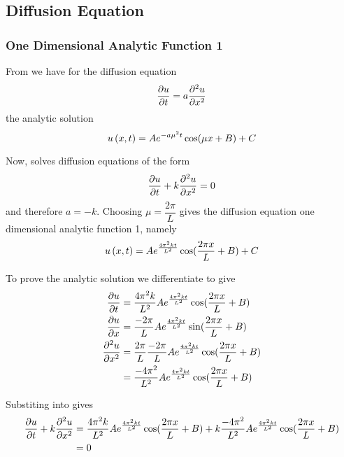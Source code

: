 \subsection{Diffusion Equation} 

\subsubsection{One Dimensional Analytic Function 1}

From  we have for the \oned diffusion equation
\begin{equation}
   \dfrac{\partial u}{\partial t} =a \dfrac{\partial^{2} u}{\partial {x}^{2}} 
\end{equation}
the analytic solution
\begin{equation}
   u\left( x,t \right) =Ae^{-a\mu^{2}t}\cos(\mu x + B) + C
\end{equation}

Now, \OpenCMISS solves diffusion equations of the form
\begin{equation}
  \delby{u}{t}+k\deltwosqby{u}{x}=0
  \label{eqn:OpenCMISSDiffusionEquationOneDim}
\end{equation}
and therefore $a=-k$. Choosing $\mu=\dfrac{2\pi}{L}$ gives the
\OpenCMISS diffusion equation one dimensional analytic function 1, namely
\begin{equation}
  \fnof{u}{x,t}=Ae^{\frac{4\pi^{2}kt}{L^{2}}}\cos(\frac{2\pi x}{L} + B) + C
  \label{eqn:AnalyticDiffusionEquationOneDim1}
\end{equation}

To prove the analytic solution we differentiate
 to give
\begin{align}
    \delby{u}{t} &=
    \dfrac{4\pi^{2}k}{L^{2}}Ae^{\frac{4\pi^{2}kt}{L^{2}}}\cos(\frac{2\pi x}{L} + B) \\
    \delby{u}{x} &=
    \dfrac{-2\pi}{L}Ae^{\frac{4\pi^{2}kt}{L^{2}}}\sin(\frac{2\pi x}{L} + B) \\
    \deltwosqby{u}{x} &=
    \dfrac{2\pi}{L}\dfrac{-2\pi}{L}Ae^{\frac{4\pi^{2}kt}{L^{2}}}\cos(\frac{2\pi x}{L} + B) \\
    & = \dfrac{-4\pi^{2}}{L^{2}}Ae^{\frac{4\pi^{2}kt}{L^{2}}}\cos(\frac{2\pi x}{L} + B)
  \label{eqn:AnalyticDiffusionEquationOneDim1Derivatives}
\end{align}

Substiting  into  gives
\begin{align}
   \dfrac{\partial u}{\partial t} +k \dfrac{\partial^{2} u}{\partial {x}^{2}}  &=
  \dfrac{4\pi^{2}k}{L^{2}}Ae^{\frac{4\pi^{2}kt}{L^{2}}}\cos(\frac{2\pi x}{L}
  + B) +
  k\dfrac{-4\pi^{2}}{L^{2}}Ae^{\frac{4\pi^{2}kt}{L^{2}}}\cos(\frac{2\pi x}{L}
  + B) \\
  &= 0
\end{align}


